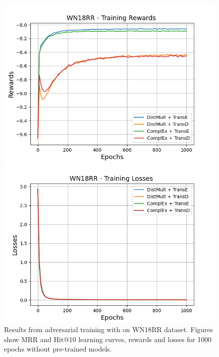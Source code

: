 \begin{figure}[H]
    \begin{minipage}{.5\textwidth}
      \centering
      \includegraphics[width=\linewidth]{figures/results/gan_train/not_pretrained/uncertainty/max_distribution/entropy/wn18rr/1k_epochs/uncertainty_wn18rr_rew.png}
    \end{minipage}%
     \begin{minipage}{.5\textwidth}
      \centering
      \includegraphics[width=\linewidth]{figures/results/gan_train/not_pretrained/uncertainty/max_distribution/entropy/wn18rr/1k_epochs/uncertainty_wn18rr_losses.png}
    \end{minipage}%
    \caption{Results from adversarial training with \ussoftmax on \textsc{WN18RR} dataset.
    Figures show MRR and Hit@10 learning curves, rewards and losses for 1000 epochs without pre-trained models.}
    \label{fig:gan_train_not_pretrained_ussoftmax_wn18rr}
\end{figure}

